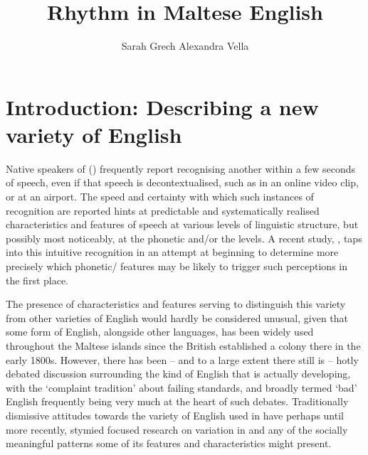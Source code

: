 \documentclass[output=paper]{langsci/langscibook}
\author{Sarah Grech\lastand
Alexandra Vella\affiliation{University of Malta}}
\title{Rhythm in Maltese English}
\begin{document}


\section{Introduction: Describing a new variety of English}
Native speakers of  () frequently report recognising another   within a few seconds of speech, even if that speech is decontextualised, such as in an online video clip, or at an airport. The speed and certainty with which such instances of recognition are reported hints at predictable and systematically realised characteristics and features of speech at various levels of linguistic structure, but possibly most noticeably, at the phonetic and/or the  levels. A recent study, \citet{Grech2015}, taps into this intuitive recognition in an attempt at beginning to determine more precisely which phonetic/ features may be likely to trigger such perceptions in the first place. 

The presence of characteristics and features serving to distinguish this variety from other varieties of English would hardly be considered unusual, given that some form of English, alongside other languages, has been widely used throughout the Maltese islands since the British established a colony there in the early 1800s. However, there has been – and to a large extent there still is – hotly debated discussion surrounding the kind of English that is actually developing, with the ‘complaint tradition’ \citep{MilroyMilroy2012} about failing standards, and broadly termed ‘bad’ English frequently being very much at the heart of such debates. Traditionally dismissive attitudes towards the variety of English used in  have perhaps until more recently, stymied focused research on variation in  and any of the socially meaningful patterns some of its features and characteristics might present. 
\end{document}
